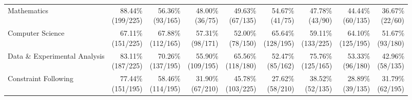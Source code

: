 \documentclass{article} %
\begin{document}
\begin{table}[htbp]
{\begin{tabular}{@{}lrrrrrrrr@{}}
			Mathematics & \shortstack{88.44\%\\(199/225)} & \shortstack{56.36\%\\(93/165)} & \shortstack{48.00\%\\(36/75)} & \shortstack{49.63\%\\(67/135)} & \shortstack{54.67\%\\(41/75)} & \shortstack{47.78\%\\(43/90)} & \shortstack{44.44\%\\(60/135)} & \shortstack{36.67\%\\(22/60)} \\
			Computer Science & \shortstack{67.11\%\\(151/225)} & \shortstack{67.88\%\\(112/165)} & \shortstack{57.31\%\\(98/171)} & \shortstack{52.00\%\\(78/150)} & \shortstack{65.64\%\\(128/195)} & \shortstack{59.11\%\\(133/225)} & \shortstack{64.10\%\\(125/195)} & \shortstack{51.67\%\\(93/180)} \\
			Data \& Experimental Analysis & \shortstack{83.11\%\\(187/225)} & \shortstack{70.26\%\\(137/195)} & \shortstack{55.90\%\\(109/195)} & \shortstack{65.56\%\\(118/180)} & \shortstack{52.47\%\\(85/162)} & \shortstack{75.76\%\\(125/165)} & \shortstack{53.33\%\\(96/180)} & \shortstack{42.96\%\\(58/135)} \\
			Constraint Following & \shortstack{77.44\%\\(151/195)} & \shortstack{58.46\%\\(114/195)} & \shortstack{31.90\%\\(67/210)} & \shortstack{45.78\%\\(103/225)} & \shortstack{27.62\%\\(58/210)} & \shortstack{38.52\%\\(52/135)} & \shortstack{28.89\%\\(39/135)} & \shortstack{31.79\%\\(62/195)} \\

\end{tabular}}
\end{table}
\end{document}
